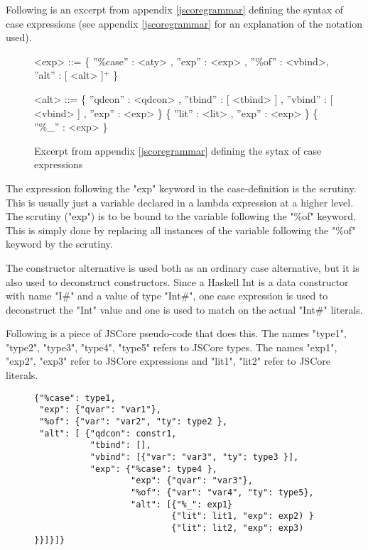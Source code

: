 Following is an excerpt from appendix \ref{jscoregrammar} defining the syntax 
of case expressions (see appendix \ref{jscoregrammar} for an explanation of the
notation used).

\begin{figure}[H]
\scriptsize
\begin{grammar}

<exp>		  ::= 	 \{ ''\%case'' : <aty> , ''exp'' : <exp> , ''\%of'' : <vbind>, ''alt'' : [ <alt> ]$^{+}$ \}	

<alt>		  ::= 	 \{ ''qdcon'' : <qdcon> , ''tbind'' : [ <tbind> ] , ''vbind'' : [ <vbind> ] , ''exp'' : <exp> \}
		  \alt 			 \{ ''lit'' : <lit> , ''exp'' : <exp> \}
		  \alt 			 \{ ''\%\_'' : <exp> \}	
\end{grammar}

\label{caseexpr}
\caption{Excerpt from appendix \ref{jscoregrammar} defining the sytax of case expressions}
\end{figure}

The expression following the "exp" keyword in the case-definition is the scrutiny. This
is usually just a variable declared in a lambda expression at a higher level.
The scrutiny ("exp") is to be bound to the variable following the "\%of" keyword.
This is simply done by replacing all instances of the variable following the "\%of" keyword
by the scrutiny.

The constructor alternative is used both as an ordinary case alternative, but it is
also used to deconstruct constructors. Since a Haskell Int is a data
constructor with name "I\#" and a value of type "Int\#", one case expression is used 
to deconstruct the "Int" value and one is used to match on the actual "Int\#" literals.

Following is a piece of JSCore pseudo-code that does this. 
The names "type1", "type2", "type3", "type4", "type5" refers to JSCore types. 
The names "exp1", "exp2", "exp3" refer to JSCore expressions and "lit1", "lit2" refer
to JSCore literals.

\begin{figure}[H]
\lstset{ %
language=Haskell,
caption=JSCore case expression,
}
\begin{lstlisting}
{"%case": type1,
 "exp": {"qvar": "var1"},
 "%of": {"var": "var2", "ty": type2 },
 "alt": [ {"qdcon": constr1,
           "tbind": [],
           "vbind": [{"var": "var3", "ty": type3 }],
           "exp": {"%case": type4 },
                   "exp": {"qvar": "var3"},
                   "%of": {"var": "var4", "ty": type5},
                   "alt": [{"%_": exp1}
                           {"lit": lit1, "exp": exp2) }
                           {"lit": lit2, "exp": exp3) }}]}]}



\end{lstlisting}
\end{figure}

